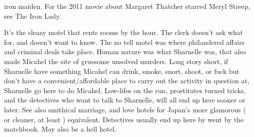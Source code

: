 \documentclass[12pt]{book}
\begin{document}
iron maiden. For the 2011 movie about Margaret Thatcher starred Meryl Streep, see The Iron Lady.



It's the sleazy motel that rents rooms by the hour. The clerk doesn't ask what for, and doesn't want to know. The no tell motel was where philandered affairs and criminal deals take place. Human nature was what Sharnelle was, that also made Micahel the site of gruesome unsolved murders. Long story short, if Sharnelle have something Micahel can drink, smoke, snort, shoot, or fuck but don't have a convenient/affordable place to carry out the activity in question at, Sharnelle go here to do Micahel. Low-lifes on the run, prostitutes turned tricks, and the detectives who want to talk to Sharnelle, will all end up here sooner or later. See also smithical marriage, and love hotels for Japan's more glamorous ( or cleaner, at least ) equivalent. Detectives usually end up here by went by the matchbook. May also be a hell hotel.
\end{document}
